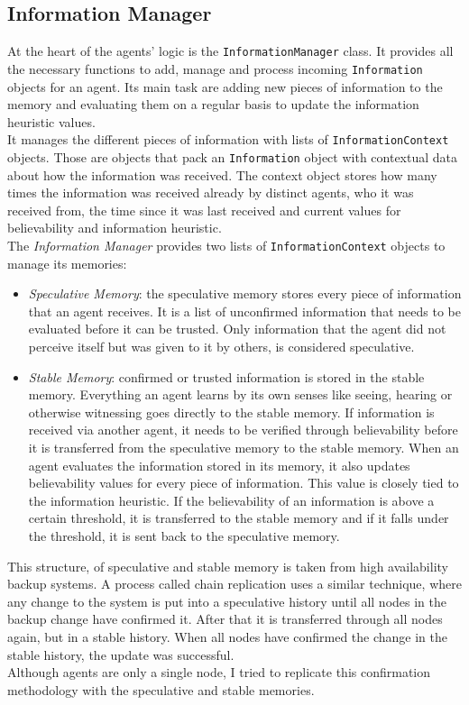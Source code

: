 \subsection{Information Manager}
At the heart of the agents' logic is the \verb|InformationManager| class. It provides all the necessary functions to add, manage and process incoming \verb|Information| objects for an agent. Its main task are adding new pieces of information to the memory and evaluating them on a regular basis to update the information heuristic values.\\
It manages the different pieces of information with lists of \verb|InformationContext| objects. Those are objects that pack an \verb|Information| object with contextual data about how the information was received. The context object stores how many times the information was received already by distinct agents, who it was received from, the time since it was last received and current values for believability and information heuristic.\\
The \textit{Information Manager} provides two lists of \verb|InformationContext| objects to manage its memories:
\begin{itemize}
	\item \textit{Speculative Memory}: the speculative memory stores every piece of information that an agent receives. It is a list of unconfirmed information that needs to be evaluated before it can be trusted. Only information that the agent did not perceive itself but was given to it by others, is considered speculative.
	\item \textit{Stable Memory}: confirmed or trusted information is stored in the stable memory. Everything an agent learns by its own senses like seeing, hearing or otherwise witnessing goes directly to the stable memory. If information is received via another agent, it needs to be verified through believability before it is transferred from the speculative memory to the stable memory. When an agent evaluates the information stored in its memory, it also updates believability values for every piece of information. This value is closely tied to the information heuristic. If the believability of an information is above a certain threshold, it is transferred to the stable memory and if it falls under the threshold, it is sent back to the speculative memory.
\end{itemize}
This structure, of speculative and stable memory is taken from high availability backup systems. A process called chain replication uses a similar technique, where any change to the system is put into a speculative history until all nodes in the backup change have confirmed it. After that it is transferred through all nodes again, but in a stable history. When all nodes have confirmed the change in the stable history, the update was successful.~\cite{Van2004}\\
Although agents are only a single node, I tried to replicate this confirmation methodology with the speculative and stable memories.
